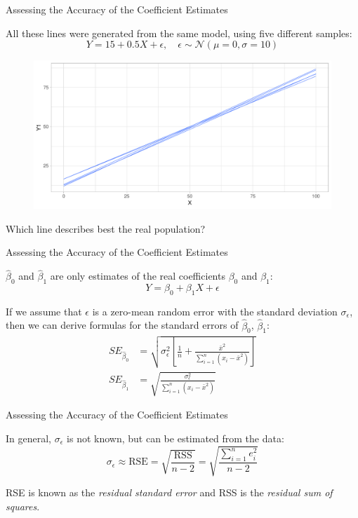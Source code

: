 \begin{frame}{Assessing the Accuracy of the Coefficient Estimates}

    All these lines were generated from the same model, using five different samples:
    \begin{equation*}
    Y = 15 + 0.5 X + \epsilon,\quad  \epsilon \sim \mathcal{N}(\mu = 0, \sigma = 10)
    \end{equation*}
    \begin{figure}
        \includegraphics[width=0.8\linewidth]{R/plots/linear_regression_acc}
    \end{figure}
    Which line describes best the real population?

\end{frame}

\begin{frame}{Assessing the Accuracy of the Coefficient Estimates}

    $\hat{\beta}_0$ and $\hat{\beta}_1$ are only estimates of the real coefficients $\beta_0$ and $\beta_1$:
    \begin{equation*}
    Y = \beta_0 + \beta_1 X + \epsilon
    \end{equation*}
    
    If we assume that $\epsilon$ is a zero-mean random error with the standard deviation $\sigma_\epsilon$, then we can derive formulas for the standard errors of $\hat{\beta}_0$, $\hat{\beta}_1$:
    \begin{align}
    SE_{\hat{\beta}_0} &= \sqrt{\sigma_{\epsilon}^2 \left[
            \frac{1}{n} + \frac{\bar{x}^2}{\sum_{i=1}^{n} (x_i - \bar{x}^2)}        
        \right]}\\
    SE_{\hat{\beta}_1} &= \sqrt{\frac{\sigma_{\epsilon}^2}{\sum_{i=1}^{n} (x_i - \bar{x}^2)}}
    \end{align}

\end{frame}

\begin{frame}{Assessing the Accuracy of the Coefficient Estimates}

    In general, $\sigma_\epsilon$ is not known, but can be estimated from the data:
    \begin{equation*}
    \sigma_\epsilon \approx \text{RSE} = \sqrt{\frac{\text{RSS}}{n - 2}} = \sqrt{\frac{\sum_{i=1}^{n} e_i^2}{n - 2}}
    \end{equation*}
    
    RSE is known as the \emph{residual standard error} and RSS is the \emph{residual sum of squares}.

\end{frame}


